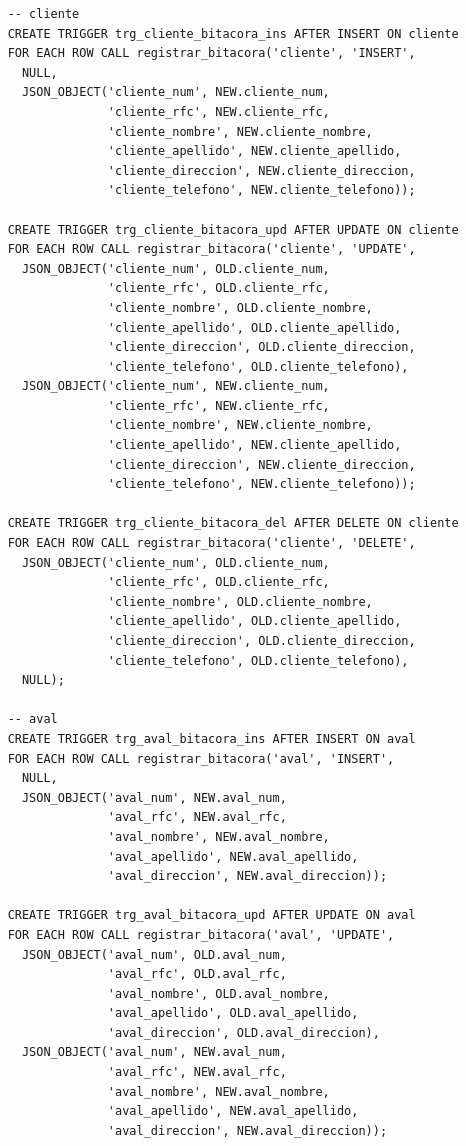 \begin{verbatim}
	-- cliente
	CREATE TRIGGER trg_cliente_bitacora_ins AFTER INSERT ON cliente
	FOR EACH ROW CALL registrar_bitacora('cliente', 'INSERT',
	  NULL,
	  JSON_OBJECT('cliente_num', NEW.cliente_num,
	              'cliente_rfc', NEW.cliente_rfc,
	              'cliente_nombre', NEW.cliente_nombre,
	              'cliente_apellido', NEW.cliente_apellido,
	              'cliente_direccion', NEW.cliente_direccion,
	              'cliente_telefono', NEW.cliente_telefono));

	CREATE TRIGGER trg_cliente_bitacora_upd AFTER UPDATE ON cliente
	FOR EACH ROW CALL registrar_bitacora('cliente', 'UPDATE',
	  JSON_OBJECT('cliente_num', OLD.cliente_num,
	              'cliente_rfc', OLD.cliente_rfc,
	              'cliente_nombre', OLD.cliente_nombre,
	              'cliente_apellido', OLD.cliente_apellido,
	              'cliente_direccion', OLD.cliente_direccion,
	              'cliente_telefono', OLD.cliente_telefono),
	  JSON_OBJECT('cliente_num', NEW.cliente_num,
	              'cliente_rfc', NEW.cliente_rfc,
	              'cliente_nombre', NEW.cliente_nombre,
	              'cliente_apellido', NEW.cliente_apellido,
	              'cliente_direccion', NEW.cliente_direccion,
	              'cliente_telefono', NEW.cliente_telefono));

	CREATE TRIGGER trg_cliente_bitacora_del AFTER DELETE ON cliente
	FOR EACH ROW CALL registrar_bitacora('cliente', 'DELETE',
	  JSON_OBJECT('cliente_num', OLD.cliente_num,
	              'cliente_rfc', OLD.cliente_rfc,
	              'cliente_nombre', OLD.cliente_nombre,
	              'cliente_apellido', OLD.cliente_apellido,
	              'cliente_direccion', OLD.cliente_direccion,
	              'cliente_telefono', OLD.cliente_telefono),
	  NULL);

	-- aval
	CREATE TRIGGER trg_aval_bitacora_ins AFTER INSERT ON aval
	FOR EACH ROW CALL registrar_bitacora('aval', 'INSERT',
	  NULL,
	  JSON_OBJECT('aval_num', NEW.aval_num,
	              'aval_rfc', NEW.aval_rfc,
	              'aval_nombre', NEW.aval_nombre,
	              'aval_apellido', NEW.aval_apellido,
	              'aval_direccion', NEW.aval_direccion));

	CREATE TRIGGER trg_aval_bitacora_upd AFTER UPDATE ON aval
	FOR EACH ROW CALL registrar_bitacora('aval', 'UPDATE',
	  JSON_OBJECT('aval_num', OLD.aval_num,
	              'aval_rfc', OLD.aval_rfc,
	              'aval_nombre', OLD.aval_nombre,
	              'aval_apellido', OLD.aval_apellido,
	              'aval_direccion', OLD.aval_direccion),
	  JSON_OBJECT('aval_num', NEW.aval_num,
	              'aval_rfc', NEW.aval_rfc,
	              'aval_nombre', NEW.aval_nombre,
	              'aval_apellido', NEW.aval_apellido,
	              'aval_direccion', NEW.aval_direccion));


\end{verbatim}
